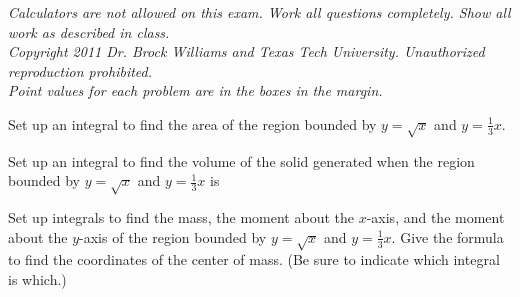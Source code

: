 \documentclass{exam}[12pt]
\begin{document}
\pagestyle{head}

\small{\textit{Calculators are not allowed on this  exam. 
Work all questions completely.  Show all work as described in class. \\
Copyright 2011 Dr. Brock Williams and
Texas Tech University.  Unauthorized reproduction prohibited.\\Point values for each
problem are in the boxes in the margin.}}

\begin{questions}
\large{

\question[7] Set up an integral to find the area of the region bounded by
$y=\sqrt{x}$ and $y= \frac{1}{3} x$.
\vspace{1.3in}

\question Set up an integral to find the volume of the solid generated when
the region bounded by $y=\sqrt{x}$ and $y= \frac{1}{3} x$ is

\question[14] Set up integrals to find the mass, the moment about the $x$-axis, and the
moment about the $y$-axis of the region bounded by $y=\sqrt{x}$ and $y= \frac{1}{3} x$.
Give the formula to find the coordinates of the center of mass. (Be sure to indicate which 
integral is which.)
\vspace{4in}

}
\end{questions}
\end{document}
